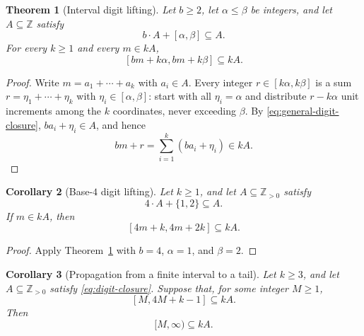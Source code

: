 \documentclass[11pt]{article}
\theoremstyle{plain}
\newtheorem{theorem}{Theorem}
\newtheorem{corollary}[theorem]{Corollary}
\theoremstyle{definition}
\begin{document}
\begin{theorem}[Interval digit lifting]\label{thm:general-digit-lifting}
Let $b\geq2$, let $\alpha\leq\beta$ be integers, and let
$A\subseteq\mathbb Z$ satisfy
\begin{equation}\label{eq:general-digit-closure}
 b\cdot A+[\alpha,\beta]\subseteq A.
\end{equation}
For every $k\geq1$ and every $m\in kA$,
\begin{equation}\label{eq:general-digit-lifting}
 [bm+k\alpha,bm+k\beta]\subseteq kA.
\end{equation}
\end{theorem}

\begin{proof}
Write $m=a_1+\cdots+a_k$ with $a_i\in A$.  Every integer
$r\in[k\alpha,k\beta]$ is a sum
$r=\eta_1+\cdots+\eta_k$ with
$\eta_i\in[\alpha,\beta]$: start with all $\eta_i=\alpha$ and distribute
$r-k\alpha$ unit increments among the $k$ coordinates, never exceeding
$\beta$.  By \eqref{eq:general-digit-closure},
$ba_i+\eta_i\in A$, and hence
\[
 bm+r=\sum_{i=1}^{k}(ba_i+\eta_i)\in kA.
\]
\end{proof}

\begin{corollary}[Base-$4$ digit lifting]\label{lem:digit-lifting}
Let $k\geq1$, and let $A\subseteq\mathbb Z_{>0}$ satisfy
\begin{equation}\label{eq:digit-closure}
 4\cdot A+\{1,2\}\subseteq A.
\end{equation}
If $m\in kA$, then
\begin{equation}\label{eq:digit-lifting}
 [4m+k,4m+2k]\subseteq kA.
\end{equation}
\end{corollary}

\begin{proof}
Apply Theorem~\ref{thm:general-digit-lifting} with
$b=4$, $\alpha=1$, and $\beta=2$.
\end{proof}

\begin{corollary}[Propagation from a finite interval to a tail]
\label{cor:tail-propagation}
Let $k\geq3$, and let $A\subseteq\mathbb Z_{>0}$ satisfy
\eqref{eq:digit-closure}.  Suppose that, for some integer $M\geq1$,
\begin{equation}\label{eq:tail-seed}
 [M,4M+k-1]\subseteq kA.
\end{equation}
Then
\[
 [M,\infty)\subseteq kA.
\]
\end{corollary}
\end{document}
